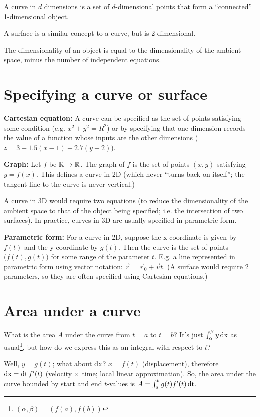 \documentclass[12pt]{article}
\begin{document}
A curve in $d$ dimensions is a set of $d$-dimensional points that form a
``connected'' 1-dimensional object.

A surface is a similar concept to a curve, but is 2-dimensional.

The dimensionality of an object is equal to the dimensionality of the ambient
space, minus the number of independent equations.

\section{Specifying a curve or surface}

\textbf{Cartesian equation:} A curve can be specified as the set of points
satisfying some condition (e.g. $x^2 + y^2 = R^2$) or by specifying that one
dimension records the value of a function whose inputs are the other
dimensions ($z = 3 + 1.5(x-1) - 2.7(y-2)$).

\textbf{Graph:} Let $f$ be $\mathbb{R} \to \mathbb{R}$. The graph of $f$ is the set of points
$(x,y)$ satisfying $y = f(x)$. This defines a curve in 2D (which never ``turns
back on itself''; the tangent line to the curve is never vertical.)

A curve in 3D would require two equations (to reduce the dimensionality of the
ambient space to that of the object being specified; i.e. the intersection of
two surfaces). In practice, curves in 3D are usually specified in parametric
form.

\textbf{Parametric form:} For a curve in 2D, suppose the x-coordinate is given
by $f(t)$ and the y-coordinate by $g(t)$. Then the curve is the set of points
$\big(f(t), g(t)\big)$ for some range of the parameter $t$. E.g. a line
represented in parametric form using vector notation:
$\vec r = \vec r_0 + \vec v t$. (A surface would require 2 parameters, so they
are often specified using Cartesian equations.)


\section{Area under a curve}

What is the area $A$ under the curve from $t=a$ to $t=b$? It's just
$\int_\alpha^\beta y \operatorname{\text{dx}}$ as usual\footnote{$(\alpha, \beta) = (f(a), f(b))$},
but how do we express this as an integral with respect to $t$?

Well, $y = g(t)$; what about $\operatorname{\text{dx}}$? $x = f(t)$ (displacement), therefore
$\operatorname{\text{dx}} = \operatorname{\text{dt}} f'(t)$ (velocity $\times$ time; local linear approximation). So, the
area under the curve bounded by start and end $t$-values is
$A = \int_a^b g(t) f'(t) \operatorname{\text{dt}}$.
\end{document}
